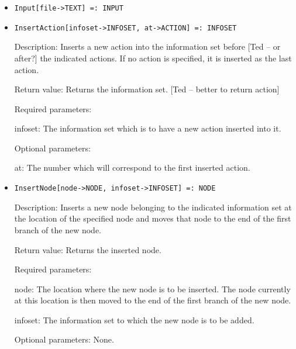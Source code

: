 \begin{itemize}
\item
\protect \large \begin{verbatim}
Input[file->TEXT] =: INPUT
\end{verbatim}\normalsize

\item
\protect \large \begin{verbatim}
InsertAction[infoset->INFOSET, at->ACTION] =: INFOSET 
\end{verbatim}\normalsize

\bd
\item
[Description:] Inserts a new action into the information set before [Ted
-- or after?] the indicated actions.  If no action is specified, it is
inserted as the last action.
\item
[Return value:] Returns the information set. [Ted -- better to return action]
\item
[Required parameters:]\hfil\null

\bd
\item
[infoset:] The information set which is to have a new
action inserted into it.
\ed

\item
[Optional parameters:]\hfill\null
\bd
\item
[at:] The number which will correspond to the first inserted action.
\ed
\ed

\item
\protect \large \begin{verbatim}
InsertNode[node->NODE, infoset->INFOSET] =: NODE
\end{verbatim}\normalsize

\bd
\item
[Description:] Inserts a new node belonging to the indicated
information set at the location of the specified node and moves that
node to the end of the first branch of the new node.
\item
[Return value:] Returns the inserted node.
\item
[Required parameters:]\hfil\null

\bd
\item
[node:] The location where the new node is to be inserted.  The node
currently at this location is then moved to the end of the first
branch of the new node.
\item
[infoset:] The information set to which the new node is to be added.  
\ed

\item
[Optional parameters:] None.
\ed


\end{itemize}
